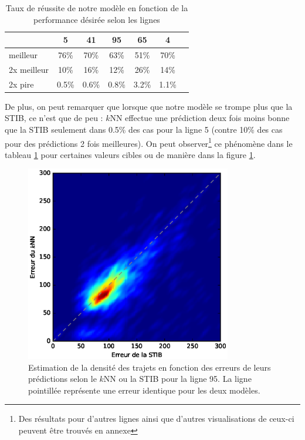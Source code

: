 \documentclass[letterpaper]{article}
\begin{document}
\begin{table}[h]
\centering
\begin{tabular}{|l|c|c|c|c|c|c|}
  \hline
              &      5 &    41 &    95 & 65    & 4     \\
  \hline
  meilleur    &  76\%  & 70\%  & 63\%  & 51\%  & 70\%  \\
  2x meilleur &  10\%  & 16\%  & 12\%  & 26\%  & 14\%  \\
  2x pire     &  0.5\% & 0.6\% & 0.8\% & 3.2\% & 1.1\% \\
  \hline

\end{tabular}
  \caption{\label{tab:perf}Taux de réussite de notre modèle en fonction de la performance désirée selon les lignes}
\end{table}


De plus, on peut remarquer que lorsque que notre modèle se trompe plus que la STIB, ce n'est que de peu : $k$NN effectue une prédiction deux fois moins bonne que la STIB seulement dans 0.5\% des cas pour la ligne 5 (contre 10\% des cas pour des prédictions 2 fois meilleures). On peut observer\footnote{Des résultats pour d'autres lignes ainsi que d'autres visualisations de ceux-ci peuvent être trouvés en annexe} ce phénomène dans le tableau \ref{tab:perf} pour certaines valeurs cibles ou de manière dans la figure \ref{fig:heatmap}.


\begin{figure}[h]
   \centerline{\includegraphics[width=9cm]{error-heatmap.eps}}
   \caption{\label{fig:heatmap} Estimation de la densité des trajets en fonction des erreurs de leurs prédictions selon le $k$NN ou la STIB pour la ligne 95. La ligne pointillée représente une erreur identique pour les deux modèles.}
\end{figure}
\end{document}
